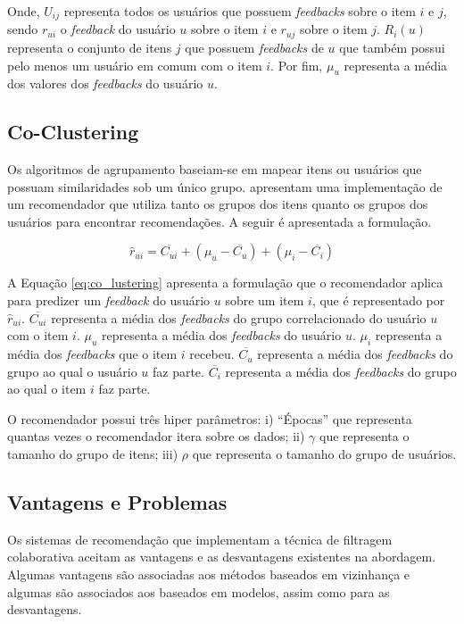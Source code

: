 Onde, $U_{ij}$ representa todos os usuários que possuem \textit{feedbacks} sobre o item $i$ e $j$, sendo $r_{ui}$ o \textit{feedback} do usuário $u$ sobre o item $i$ e $r_{uj}$ sobre o item $j$. $R_{i}(u)$ representa o conjunto de itens $j$ que possuem \textit{feedbacks} de $u$ que também possui pelo menos um usuário em comum com o item $i$. Por fim, $\mu_u$ representa a média dos valores dos \textit{feedbacks} do usuário $u$.

\subsection{Co-Clustering}
\label{sec:clustering_algo}
Os algoritmos de agrupamento baseiam-se em mapear itens ou usuários que possuam similaridades sob um único grupo.  apresentam uma implementação de um recomendador que utiliza tanto os grupos dos itens quanto os grupos dos usuários para encontrar recomendações. A seguir é apresentada a formulação. 

\begin{equation}
    \label{eq:co_lustering}
    \hat{r}_{ui} = \overline{C_{ui}} + (\mu_u  - \overline{C_{u}}) + (\mu_i  - \overline{C_{i}})
\end{equation}

A Equação \ref{eq:co_lustering} apresenta a formulação que o recomendador aplica para predizer um \textit{feedback} do usuário $u$ sobre um item $i$, que é representado por $\hat{r}_{ui}$. $\overline{C_{ui}}$ representa a média dos \textit{feedbacks} do grupo correlacionado do usuário $u$ com o item $i$. $\mu_u$ representa a média dos \textit{feedbacks} do usuário $u$. $\mu_i$ representa a média dos \textit{feedbacks} que o item $i$ recebeu. $\overline{C_{u}}$ representa a média dos \textit{feedbacks} do grupo ao qual o usuário $u$ faz parte. $\overline{C_{i}}$ representa a média dos \textit{feedbacks} do grupo ao qual o item $i$ faz parte.

O recomendador possui três hiper parâmetros: i) ``Épocas'' que representa quantas vezes o recomendador itera sobre os dados; ii) $\gamma$ que representa o tamanho do grupo de itens; iii) $\rho$ que representa o tamanho do grupo de usuários.

\subsection{Vantagens e Problemas}
Os sistemas de recomendação que implementam a técnica de filtragem colaborativa aceitam as vantagens e as desvantagens existentes na abordagem. Algumas vantagens são associadas aos métodos baseados em vizinhança e algumas são associados aos baseados em modelos, assim como para as desvantagens.

